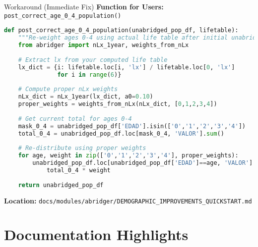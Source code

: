 \documentclass[aspectratio=169]{beamer}
\begin{document}
\begin{frame}[fragile]{Workaround (Immediate Fix)}
\textbf{Function for Users:} \texttt{post\_correct\_age\_0\_4\_population()}

\begin{lstlisting}[language=Python, basicstyle=\ttfamily\tiny]
def post_correct_age_0_4_population(unabridged_pop_df, lifetable):
    """Re-weight ages 0-4 using actual life table after initial unabridging."""
    from abridger import nLx_1year, weights_from_nLx
    
    # Extract lx from your computed life table
    lx_dict = {i: lifetable.loc[i, 'lx'] / lifetable.loc[0, 'lx'] 
               for i in range(6)}
    
    # Compute proper nLx weights
    nLx_dict = nLx_1year(lx_dict, a0=0.10)
    proper_weights = weights_from_nLx(nLx_dict, [0,1,2,3,4])
    
    # Get current total for ages 0-4
    mask_0_4 = unabridged_pop_df['EDAD'].isin(['0','1','2','3','4'])
    total_0_4 = unabridged_pop_df.loc[mask_0_4, 'VALOR'].sum()
    
    # Re-distribute using proper weights
    for age, weight in zip(['0','1','2','3','4'], proper_weights):
        unabridged_pop_df.loc[unabridged_pop_df['EDAD']==age, 'VALOR'] = \
            total_0_4 * weight
    
    return unabridged_pop_df
\end{lstlisting}

\textbf{Location:} \texttt{docs/modules/abridger/DEMOGRAPHIC\_IMPROVEMENTS\_QUICKSTART.md}
\end{frame}

\section{Documentation Highlights}
\end{document}
